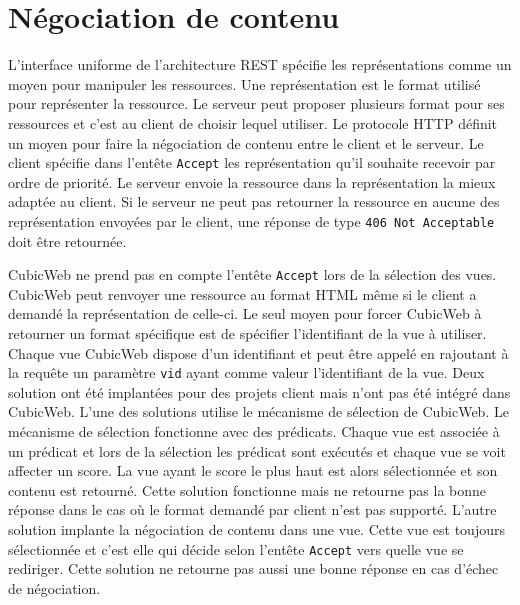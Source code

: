 \section{Négociation de contenu} 
L'interface uniforme de l'architecture REST spécifie les représentations comme un moyen pour manipuler les ressources. Une représentation est le format utilisé pour représenter la ressource. Le serveur peut proposer plusieurs format pour ses ressources et c'est au client de choisir lequel utiliser. Le protocole HTTP définit un moyen pour faire la négociation de contenu entre le client et le serveur. Le client spécifie dans l'entête \texttt{Accept} les représentation qu'il souhaite recevoir par ordre de priorité. Le serveur envoie la ressource dans la représentation la mieux adaptée au client. Si le serveur ne peut pas retourner la ressource en aucune des représentation envoyées par le client, une réponse de type \texttt{406~Not~Acceptable} doit être retournée.

CubicWeb ne prend pas en compte l'entête \texttt{Accept} lors de la sélection des vues. CubicWeb peut renvoyer une ressource au format HTML même si le client a demandé la représentation  de celle-ci. Le seul moyen pour forcer CubicWeb à retourner un format spécifique est de spécifier l'identifiant de la vue à utiliser. Chaque vue CubicWeb dispose d'un identifiant et peut être appelé en rajoutant à la requête un paramètre \texttt{vid} ayant comme valeur l'identifiant de la vue. Deux solution ont été implantées pour des projets client mais n'ont pas été intégré dans CubicWeb. L'une des solutions utilise le mécanisme de sélection de CubicWeb. Le mécanisme de sélection fonctionne avec des prédicats. Chaque vue est associée à un prédicat et lors de la sélection les prédicat sont exécutés et chaque vue se voit affecter un score. La vue ayant le score le plus haut est alors sélectionnée et son contenu est retourné. Cette solution fonctionne mais ne retourne pas la bonne réponse dans le cas où le format demandé par client n'est pas supporté. L'autre solution implante la négociation de contenu dans une vue. Cette vue est toujours sélectionnée et c'est elle qui décide selon l'entête \texttt{Accept} vers quelle vue se rediriger. Cette solution ne retourne pas aussi une bonne réponse en cas d'échec de négociation.

